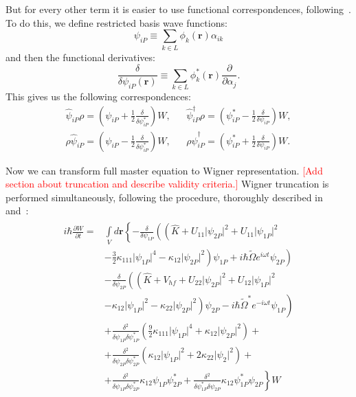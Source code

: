 \documentclass[12pt,notitlepage]{report}
\begin{document}
But for every other term it is easier to use functional correspondences, following~\cite{norrie_ballagh_gardiner_bradley_2006}.
To do this, we define restricted basis wave functions:
\[
\psi_{iP} \equiv \sum\limits_{k \in L} \phi_k (\mathbf{r}) \alpha_{ik}
\]
and then the functional derivatives:
\[
\frac{\delta}{\delta \psi_{iP} (\mathbf{r})} \equiv \sum\limits_{k \in L} \phi_k^* (\mathbf{r}) \frac{\partial}{\partial \alpha_j}.
\]
This gives us the following correspondences:
\begin{align*}
\hat{\psi}_{iP} \rho = \left( \psi_{iP} + \frac{1}{2} \frac{\delta}{\delta \psi_{iP}^*} \right) W, & &
\hat{\psi}_{iP}^\dagger \rho = \left( \psi_{iP}^* - \frac{1}{2} \frac{\delta}{\delta \psi_{iP}} \right) W, \\
\rho \hat{\psi}_{iP} = \left( \psi_{iP} - \frac{1}{2} \frac{\delta}{\delta \psi_{iP}^*} \right) W, & &
\rho \hat{\psi}_{iP}^\dagger = \left( \psi_{iP}^* + \frac{1}{2} \frac{\delta}{\delta \psi_{iP}} \right) W.
\end{align*}

Now we can transform full master equation to Wigner representation.
\textcolor{red}{[Add section about truncation and describe validity criteria.]}
Wigner truncation is performed simultaneously,
following the procedure, thoroughly described in~\cite{norrie_ballagh_gardiner_2006} and~\cite{norrie_ballagh_gardiner_bradley_2006}:
\begin{align*}
\begin{split}
i \hbar \frac{\partial W}{\partial t} = & \int\limits_V d\mathbf{r} \left\{
	- \frac{\delta}{\delta \psi_{1P}} \left( \left(
		\hat{K} + U_{11} \lvert \psi_{2P} \rvert^2 + U_{11} \lvert \psi_{1P} \rvert^2 \right. \right. \right. \\
		& \left. \left. \left. - \frac{3}{2} \kappa_{111} \lvert \psi_{1P} \rvert^4 - \kappa_{12} \lvert \psi_{2P} \rvert^2
	\right) \psi_{1P} + i \hbar \tilde{\Omega} e^{i \omega t} \psi_{2P} \right) \right. \\
& \left. - \frac{\delta}{\delta \psi_{2P}} \left( \left(
		\hat{K} + V_{hf} + U_{22} \lvert \psi_{2P} \rvert^2 + U_{12} \lvert \psi_{1P} \rvert^2 \right. \right. \right. \\
		& \left. \left. \left. - \kappa_{12} \lvert \psi_{1P} \rvert^2 - \kappa_{22} \lvert \psi_{2P} \rvert^2
	\right) \psi_{2P} - i \hbar \tilde{\Omega}^* e^{-i \omega t} \psi_{1P} \right) \right. \\
& \left. + \frac{\delta^2}{\delta \psi_{1P} \delta \psi_{1P}^*} \left(
	\frac{9}{2} \kappa_{111} \lvert \psi_{1P} \rvert^4 + \kappa_{12} \lvert \psi_{2P} \rvert^2
\right) + \right. \\
& \left. + \frac{\delta^2}{\delta \psi_{2P} \delta \psi_{2P}^*} \left(
	\kappa_{12} \lvert \psi_{1P} \rvert^2 + 2 \kappa_{22} \lvert \psi_2 \rvert^2
\right) + \right. \\
& \left. + \frac{\delta^2}{\delta \psi_{1P} \delta \psi_{2P}^*} \kappa_{12} \psi_{1P} \psi_{2P}^*
+ \frac{\delta^2}{\delta \psi_{1P}^* \delta \psi_{2P}} \kappa_{12} \psi_{1P}^* \psi_{2P}
\right\} W
\end{split}
\end{align*}
\end{document}
